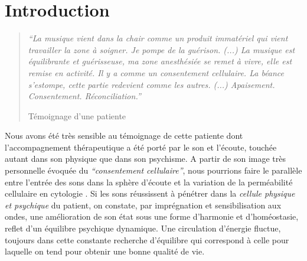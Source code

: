 
\chapter{Introduction}





\begin{quotation}
 \textit{``La musique vient dans la chair comme un produit immatériel
 qui vient travailler la zone à soigner. Je pompe de la
 guérison.
 (...)
 La musique est équilibrante et guérisseuse, ma zone
 anesthésiée se remet à vivre, elle est remise en activité.
 Il y a comme un consentement cellulaire.
La béance s'estompe, cette
partie redevient comme les autres. (...)
Apaisement. Consentement. Réconciliation.''}

Témoignage d'une patiente

\end{quotation}



Nous avons été très sensible au témoignage de cette patiente dont l'accompagnement thérapeutique a 
été porté par le son et l'écoute, touchée autant dans son physique que dans son psychisme.
A partir de son image très personnelle évoquée du \textit{``consentement cellulaire''}, nous pourrions 
faire le
parallèle entre l'entrée des sons dans la sphère d'écoute et la variation de la
perméabilité cellulaire en cytologie \autocite{marieb:biologie}. Si les sons réussissent à pénétrer dans la
\textit{cellule physique et psychique} du patient,  on constate, par 
imprégnation et sensibilisation aux ondes,
une amélioration de son état %
sous une forme d'harmonie et d'homéostasie,  
\autocite[10]{marieb:biologie} 
reflet d'un équilibre psychique dynamique.  
Une circulation d'énergie  fluctue, toujours dans cette  constante recherche d'équilibre qui 
correspond  à celle pour laquelle on tend pour obtenir  une bonne qualité de vie.


